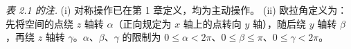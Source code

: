 \begin{table}[H]
\smallskip
\parbox{0.92\textwidth}{\textit{表 2.1 的注.}
(i) 对称操作已在第 1 章定义，均为主动操作。
(ii) 欧拉角定义为：先将空间的点绕 $z$ 轴转 $\alpha$（正向规定为 $x$ 轴上的点转向 $y$ 轴），随后绕 $y$ 轴转 $\beta$，再绕 $z$ 轴转 $\gamma$。$\alpha$、$\beta$、$\gamma$ 的限制为 $0 \leqslant \alpha < 2\pi$、$0 \leqslant \beta \leqslant \pi$、$0 \leqslant \gamma < 2\pi$。}
\end{table}
